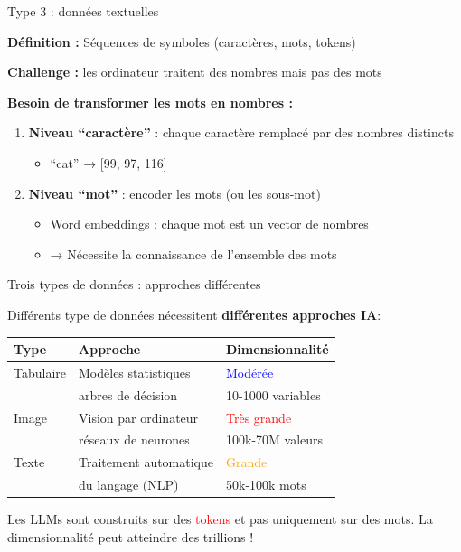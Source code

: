 \begin{frame}{Type 3 : données textuelles}

\textbf{Définition :} Séquences de symboles (caractères, mots, tokens)

\vspace{0.3cm}

\textbf{Challenge :} les ordinateur traitent des nombres mais pas des mots

\vspace{0.3cm}

\textbf{Besoin de transformer les mots en nombres :}

\begin{enumerate}
    \item \textbf{Niveau ``caractère''} : chaque caractère remplacé par des nombres distincts
        \begin{itemize}
            \item[\textcolor{white}{x}] ``cat'' → [99, 97, 116]
        \end{itemize}
    
    \item \textbf{Niveau ``mot''} : encoder les mots (ou les sous-mot)
        \begin{itemize}
          \item[\textcolor{white}{x}] Word embeddings : chaque mot est un vector de nombres
          \item[\textcolor{white}{x}] → Nécessite la connaissance de l'ensemble des mots
        \end{itemize}
\end{enumerate}

\end{frame}




\begin{frame}{Trois types de données : approches différentes}

Différents type de données nécessitent \textbf{différentes approches IA}:

\vspace{0.5cm}

\begin{tabular}{l|l|l}
\textbf{Type} & \textbf{Approche} & \textbf{Dimensionnalité}\\
\hline
Tabulaire & Modèles statistiques & \textcolor{blue}{Modérée}\\
          & arbres de décision   & 10-1000 variables \\
Image & Vision par ordinateur    & \textcolor{red}{Très grande}\\
      & réseaux de neurones      & 100k-70M valeurs\\
Texte & Traitement automatique   & \textcolor{orange}{Grande}\\
      & du langage (NLP)         & 50k-100k mots\\
\end{tabular}

Les LLMs sont construits sur des \textcolor{red}{tokens} et pas uniquement sur des mots. La dimensionnalité peut atteindre des trillions !

\end{frame}

